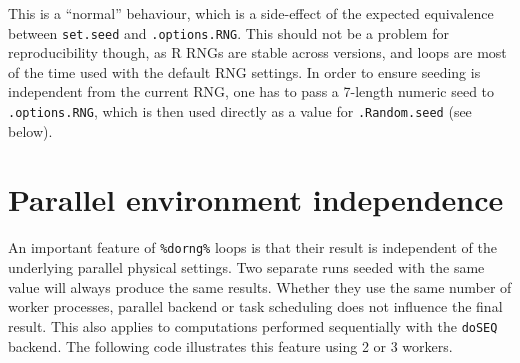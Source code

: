 \documentclass[a4paper,12pt]{article}\usepackage{graphicx, color}
\let\code=\texttt
\begin{document}
This is a ``normal'' behaviour, which is a side-effect of the expected equivalence between 
\code{set.seed} and \code{.options.RNG}.
This should not be a problem for reproducibility though, as R RNGs are stable across versions, 
and loops are most of the time used with the default RNG settings. 
In order to ensure seeding is independent from the current RNG, one has to pass a 
7-length numeric seed to \code{.options.RNG}, which is then used directly as a value 
for \code{.Random.seed} (see below).

\section{Parallel environment independence}
An important feature of \code{\%dorng\%} loops is that their result is
independent of the underlying parallel physical settings.
Two separate runs seeded with the same value will always produce the same
results.
Whether they use the same number of worker processes, parallel backend or
task scheduling does not influence the final result.
This also applies to computations performed sequentially with the \code{doSEQ}
backend.
The following code illustrates this feature using 2 or 3 workers.
\end{document}
